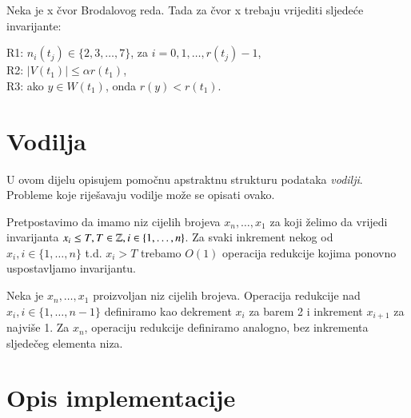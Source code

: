 \begin{defn}\label{R_inv}
  Neka je x \v{c}vor Brodalovog reda. Tada za \v{c}vor x trebaju vrijediti sljede\'{c}e invarijante:
  \begin{myindentpar}{15pt}
    R1: $n_{i}(t_{j}) \in \{2,3,\dotsc,7\}$, za $i = 0,1,\dotsc,r(t_{j}) - 1$,\\
    R2: $|V(t_{1})| \le \alpha r(t_{1})$, \\
    R3: ako $y \in W(t_{1})$, onda $r(y) < r(t_{1})$.
  \end{myindentpar}
\end{defn}

\section{Vodilja}
U ovom dijelu opisujem pomo\v{c}nu apstraktnu strukturu podataka \emph{vodilji}. Probleme koje rije\v{s}avaju vodilje mo\v{z}e se opisati ovako.

\begin{defn}
  Pretpostavimo da imamo niz cijelih brojeva $x_{n},\ldots,x_{1}$ za koji \v{z}elimo da vrijedi invarijanta $x_{i} \le T, T \in \mathbb{Z}, i \in \{1,\ldots,n\}$.
  Za svaki inkrement nekog od $x_{i}, i \in \{1,\ldots,n\}$ t.d. $x_{i} > T$ trebamo $O(1)$ operacija redukcije kojima ponovno uspostavljamo invarijantu.
\end{defn}

\begin{defn}
  Neka je $x_{n},\ldots,x_{1}$ proizvoljan niz cijelih brojeva.
  Operacija redukcije nad $x_{i}, i \in \{1,\ldots,n-1\}$ definiramo kao dekrement $x_{i}$ za barem 2 i inkrement $x_{i+1}$ za najvi\v{s}e 1.
  Za $x_{n}$, operaciju redukcije definiramo analogno, bez inkrementa sljede\v{c}eg elementa niza.
\end{defn}

\section{Opis implementacije}
